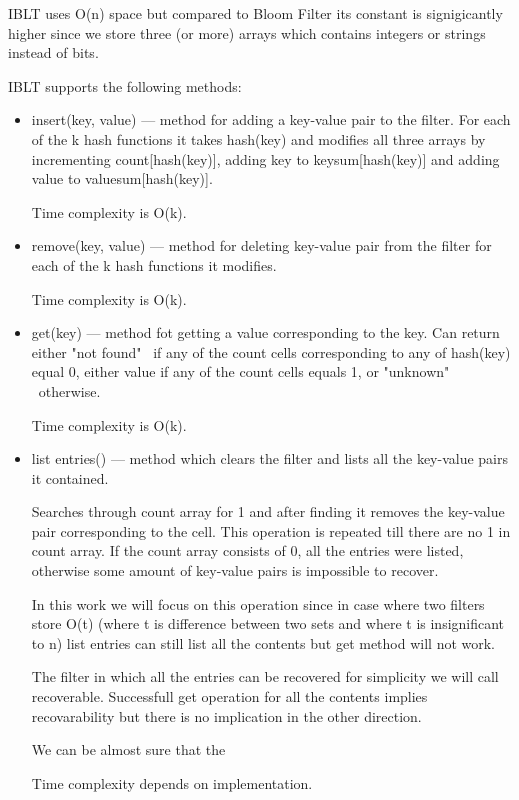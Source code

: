 \documentclass{article}
\begin{document}
IBLT uses O(n) space but compared to Bloom Filter its constant is signigicantly 
higher since we store three (or more) arrays which contains integers or strings 
instead of bits.

IBLT supports the following methods:
\begin{itemize}
    \item insert(key, value) --- method for adding a key-value pair to the filter.
        For each of the k hash functions it takes hash(key) and modifies all 
        three arrays by incrementing count[hash(key)], adding key to 
        keysum[hash(key)] and adding value to valuesum[hash(key)]. 

        Time complexity is O(k).
    \item remove(key, value) --- method for deleting key-value pair from the
        filter for each of the k hash functions it modifies.

        Time complexity is O(k).
    \item get(key) --- method fot getting a value corresponding to the key.
        Can return either "not found" \  if any of the count cells corresponding
        to any of hash(key) equal 0, either value if any of the count cells 
        equals 1, or "unknown" \ otherwise.

        Time complexity is O(k).
    \item list entries() --- method which clears the filter and lists all the 
        key-value pairs it contained.

        Searches through count array for 1 and after finding it removes the
        key-value pair corresponding to the cell. This operation is repeated till
        there are no 1 in count array. If the count array consists of 0, all the
        entries were listed, otherwise some amount of key-value pairs is 
        impossible to recover.

        In this work we will focus on this operation since in case where two
        filters store O(t) (where t is difference between two sets and where t
        is insignificant to n) list entries can still list all the contents but 
        get method will not work.

        The filter in which all the entries can be recovered for simplicity we 
        will call recoverable. Successfull get operation for all the contents 
        implies recovarability but there is no implication in the other direction.
        
        We can be almost sure that the  

        Time complexity depends on implementation.
\end{itemize}
\end{document}
